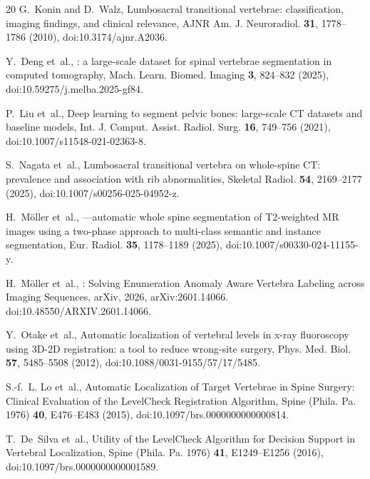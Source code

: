 \documentclass[aapm,mph,amsmath,amssymb,reprint]{revtex4-2}
\begin{document}
\begin{thebibliography}{20}
G.~Konin and D.~Walz,
\newblock Lumbosacral transitional vertebrae: classification, imaging findings, and clinical relevance,
\newblock AJNR Am. J. Neuroradiol. {\bf 31}, 1778--1786 (2010),
\newblock doi:10.3174/ajnr.A2036.

Y.~Deng et~al.,
: a large-scale dataset for spinal vertebrae segmentation in computed tomography,
\newblock Mach. Learn. Biomed. Imaging {\bf 3}, 824--832 (2025),
\newblock doi:10.59275/j.melba.2025-gf84.

P.~Liu et~al.,
\newblock Deep learning to segment pelvic bones: large-scale {CT} datasets and baseline models,
\newblock Int. J. Comput. Assist. Radiol. Surg. {\bf 16}, 749--756 (2021),
\newblock doi:10.1007/s11548-021-02363-8.

S.~Nagata et~al.,
\newblock Lumbosacral transitional vertebra on whole-spine {CT}: prevalence and association with rib abnormalities,
\newblock Skeletal Radiol. {\bf 54}, 2169--2177 (2025),
\newblock doi:10.1007/s00256-025-04952-z.

H.~M{\"o}ller et~al.,
—automatic whole spine segmentation of {T2}-weighted {MR} images using a two-phase approach to multi-class semantic and instance segmentation,
\newblock Eur. Radiol. {\bf 35}, 1178--1189 (2025),
\newblock doi:10.1007/s00330-024-11155-y.

H.~M{\"o}ller et~al.,
: Solving Enumeration Anomaly Aware Vertebra Labeling across Imaging Sequences,
\newblock arXiv, 2026,
\newblock arXiv:2601.14066. doi:10.48550/ARXIV.2601.14066.

Y.~Otake et~al.,
\newblock Automatic localization of vertebral levels in x-ray fluoroscopy using {3D-2D} registration: a tool to reduce wrong-site surgery,
\newblock Phys. Med. Biol. {\bf 57}, 5485--5508 (2012),
\newblock doi:10.1088/0031-9155/57/17/5485.

S.-f.~L. Lo et~al.,
\newblock Automatic Localization of Target Vertebrae in Spine Surgery: Clinical Evaluation of the {LevelCheck} Registration Algorithm,
\newblock Spine (Phila. Pa. 1976) {\bf 40}, E476--E483 (2015),
\newblock doi:10.1097/brs.0000000000000814.

T.~De~Silva et~al.,
\newblock Utility of the {LevelCheck} Algorithm for Decision Support in Vertebral Localization,
\newblock Spine (Phila. Pa. 1976) {\bf 41}, E1249--E1256 (2016),
\newblock doi:10.1097/brs.0000000000001589.


\end{thebibliography}
\end{document}
